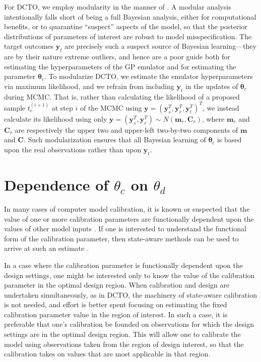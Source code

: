 \documentclass[twocolumn,10pt]{asme2ej}
\begin{document}
For DCTO, we employ modularity in the manner of \cite{Liu2009}. 
%
A modular analysis intentionally falls short of being a full Bayesian analysis, either for computational benefits, or to quarantine ``suspect'' aspects of the model, so that the posterior distributions of parameters of interest are robust to model misspecification.
%
The target outcomes $\mathbf y_t$ are precisely such a suspect source of Bayesian learning---they are by their nature extreme outliers, and hence are a poor guide both for estimating the hyperparameters of the GP emulator and for estimating the parameter $\boldsymbol\theta_c$.
%
To modularize DCTO, we estimate the emulator hyperparameters via maximum likelihood, and we refrain from including $\mathbf y_t$ in the updates of $\boldsymbol\theta_c$ during MCMC.
%
That is, rather than calculating the likelihood of a proposed sample $t_c^{(i+1)}$ at step $i$ of the MCMC using $\mathbf y = (\mathbf y_s^T, \mathbf y_r^T, \mathbf y_t^T)^T$, we instead calculate its likelihood using only $\mathbf y = (\mathbf y_s^T, \mathbf y_r^T)\sim N(\mathbf m_r,\mathbf C_r)$, where $\mathbf m_r$ and $\mathbf C_r$ are respectively the upper two and upper-left two-by-two components of $\mathbf m$ and $\mathbf C$.
%
Such modularization ensures that all Bayesian learning of $\boldsymbol\theta_c$ is based upon the real observations rather than upon $\mathbf y_t$.
%

%
\section{Dependence of $\theta_c$ on $\theta_d$}\label{sec:as}
%
In many cases of computer model calibration, it is known or suspected that the value of one or more calibration parameters are functionally dependent upon the values of other model inputs \cite{Atamturktur2015,Atamturktur2017,Ezzat2018}.
%
If one is interested to understand the functional form of the calibration parameter, then state-aware methods can be used to arrive at such an estimate \cite{Atamturktur2015,Atamturktur2017,Brown2018}.
%

%
In a case where the calibration parameter is functionally dependent upon the design settings, one might be interested only to know the value of the calibration parameter in the optimal design region.
%
When calibration and design are undertaken simultaneously, as in DCTO, the machinery of state-aware calibration is not needed, and effort is better spent focusing on estimating the fixed calibration parameter value in the region of interest.
%
In such a case, it is preferable that one's calibration be founded on observations for which the design settings are in the optimal design region.
%
This will allow one to calibrate the model using observations taken from the region of design interest, so that the calibration takes on values that are most applicable in that region.
%
\end{document}
